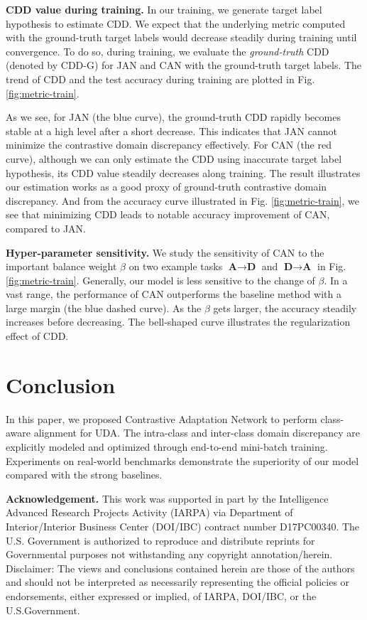 \documentclass[10pt,twocolumn,letterpaper]{article}
\begin{document}
\textbf{CDD value during training.}
In our training, we generate target label hypothesis to estimate CDD.
We expect that the underlying metric computed with the ground-truth target labels 
would decrease steadily during training until convergence.
To do so, during training, we evaluate the \textit{ground-truth} CDD (denoted by CDD-G) for JAN and CAN with the ground-truth target labels. The trend of CDD and the test accuracy during training are plotted in Fig. \ref{fig:metric-train}. 




As we see, for JAN (the blue curve), the ground-truth CDD rapidly becomes stable at a high level
after a short decrease.
This indicates that JAN cannot minimize the contrastive domain discrepancy effectively. For CAN (the red curve), although we can only estimate the CDD using inaccurate target label hypothesis, 
its CDD value steadily decreases along training.
The result illustrates our estimation works as a good proxy of ground-truth contrastive domain discrepancy.
And from the accuracy curve illustrated in Fig. \ref{fig:metric-train}, 
we see that minimizing CDD leads to notable accuracy improvement of CAN,
compared to JAN.


\textbf{Hyper-parameter sensitivity.}
We study the sensitivity of CAN to the important balance weight $\beta$ on two example tasks $\textbf{A} \rightarrow \textbf{D}$ and $\textbf{D} \rightarrow \textbf{A}$ in Fig. \ref{fig:metric-train}. 
Generally, our model is less sensitive to the change of $\beta$. In a vast range, the performance of CAN outperforms the baseline method with a large margin (the blue dashed curve). As the $\beta$ gets larger, the accuracy steadily increases before decreasing. The bell-shaped curve illustrates the regularization effect of CDD.  
\section{Conclusion}
In this paper, we proposed Contrastive Adaptation Network to perform class-aware alignment for 
UDA.
The intra-class and inter-class domain discrepancy are explicitly modeled and optimized through end-to-end mini-batch training. 
Experiments on real-world benchmarks 
demonstrate the superiority of our model compared with the strong baselines. 
%
 
\textbf{Acknowledgement.} \small{This work was supported in part by  the  Intelligence  Advanced Research Projects Activity (IARPA) via Department of  Interior/Interior  Business  Center  (DOI/IBC)  contract number  D17PC00340.  The  U.S.  Government  is  authorized to reproduce and distribute reprints for Governmental purposes  not withstanding  any  copyright  annotation/herein. Disclaimer: The views and conclusions contained herein are those of the authors and should not be interpreted as necessarily  representing  the  official  policies  or  endorsements, either expressed or implied, of IARPA, DOI/IBC, or the U.S.Government.}

{\small


}
\end{document}
